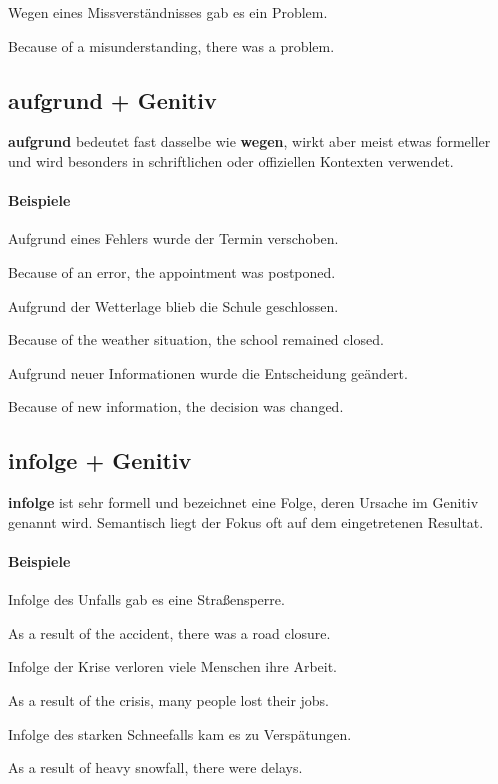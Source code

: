 \documentclass[a4paper]{article}
\newcommand{\EN}[1]{\par{\small\textcolor{TranslationGray}{#1}}\vspace{0.25em}}
\begin{document}
            Wegen eines Missverständnisses gab es ein Problem.\\
            \EN{Because of a misunderstanding, there was a problem.}
    
    \subsection{aufgrund + Genitiv}
    \textbf{aufgrund} bedeutet fast dasselbe wie \textbf{wegen}, wirkt aber meist etwas formeller und wird besonders in schriftlichen oder offiziellen Kontexten verwendet.
    
    \paragraph{Beispiele}
        Aufgrund eines Fehlers wurde der Termin verschoben.\\
        \EN{Because of an error, the appointment was postponed.}
        
        Aufgrund der Wetterlage blieb die Schule geschlossen.\\
        \EN{Because of the weather situation, the school remained closed.}
        
        Aufgrund neuer Informationen wurde die Entscheidung geändert.\\
        \EN{Because of new information, the decision was changed.}
    
    \subsection{infolge + Genitiv}
    \textbf{infolge} ist sehr formell und bezeichnet eine Folge, deren Ursache im Genitiv genannt wird. Semantisch liegt der Fokus oft auf dem eingetretenen Resultat.
    
    \paragraph{Beispiele}
        Infolge des Unfalls gab es eine Straßensperre.\\
        \EN{As a result of the accident, there was a road closure.}
        
        Infolge der Krise verloren viele Menschen ihre Arbeit.\\
        \EN{As a result of the crisis, many people lost their jobs.}
        
        Infolge des starken Schneefalls kam es zu Verspätungen.\\
        \EN{As a result of heavy snowfall, there were delays.}
    
\end{document}
